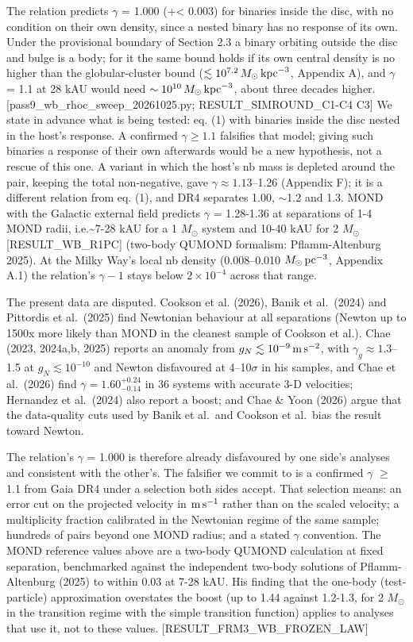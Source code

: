 \documentclass[
  10pt,
]{article}
\begin{document}
The relation predicts $\gamma$ = 1.000 (+\textless{} 0.003) for binaries inside the disc, with no condition on their own density, since a nested binary has no response of its own. Under the provisional boundary of Section 2.3 a binary orbiting outside the disc and bulge is a body; for it the same bound holds if its own central density is no higher than the globular-cluster bound ($\lesssim10^{7.2}\,M_\odot\,{\rm kpc}^{-3}$, Appendix A), and $\gamma$ = 1.1 at 28 kAU would need $\sim10^{10}\,M_\odot\,{\rm kpc}^{-3}$, about three decades higher. {[}pass9\_wb\_rhoc\_sweep\_20261025.py; RESULT\_SIMROUND\_C1-C4 C3{]} We state in advance what is being tested: eq. (1) with binaries inside the disc nested in the host's response. A confirmed $\gamma\ge1.1$ falsifies that model; giving such binaries a response of their own afterwards would be a new hypothesis, not a rescue of this one. A variant in which the host's nb mass is depleted around the pair, keeping the total non-negative, gave $\gamma\approx1.13$--1.26 (Appendix F); it is a different relation from eq. (1), and DR4 separates 1.00, $\sim$1.2 and 1.3. MOND with the Galactic external field predicts $\gamma$ = 1.28-1.36 at separations of 1-4 MOND radii, i.e.\textasciitilde{}7-28 kAU for a 1 $M_\odot$ system and 10-40 kAU for 2 $M_\odot$ {[}RESULT\_WB\_R1PC{]} (two-body QUMOND formalism: Pflamm-Altenburg 2025). At the Milky Way's local nb density (0.008--0.010 $M_\odot\,{\rm pc}^{-3}$, Appendix A.1) the relation's $\gamma-1$ stays below $2\times10^{-4}$ across that range.

The present data are disputed. Cookson et al. (2026), Banik et al.~(2024) and Pittordis et al.~(2025) find Newtonian behaviour at all separations (Newton up to 1500x more likely than MOND in the cleanest sample of Cookson et al.). Chae (2023, 2024a,b, 2025) reports an anomaly from $g_N\lesssim10^{-9}\,{\rm m\,s^{-2}}$, with $\gamma_g\approx1.3$--1.5 at $g_N\lesssim10^{-10}$ and Newton disfavoured at 4--10$\sigma$ in his samples, and Chae et al.~(2026) find $\gamma=1.60^{+0.24}_{-0.14}$ in 36 systems with accurate 3-D velocities; Hernandez et al.~(2024) also report a boost; and Chae \& Yoon (2026) argue that the data-quality cuts used by Banik et al.~and Cookson et al.~bias the result toward Newton.

The relation's $\gamma$ = 1.000 is therefore already disfavoured by one side's analyses and consistent with the other's. The falsifier we commit to is a confirmed $\gamma$ $\ge$ 1.1 from Gaia DR4 under a selection both sides accept. That selection means: an error cut on the projected velocity in ${\rm m\,s^{-1}}$ rather than on the scaled velocity; a multiplicity fraction calibrated in the Newtonian regime of the same sample; hundreds of pairs beyond one MOND radius; and a stated $\gamma$ convention. The MOND reference values above are a two-body QUMOND calculation at fixed separation, benchmarked against the independent two-body solutions of Pflamm-Altenburg (2025) to within 0.03 at 7-28 kAU. His finding that the one-body (test-particle) approximation overstates the boost (up to 1.44 against 1.2-1.3, for 2 $M_\odot$ in the transition regime with the simple transition function) applies to analyses that use it, not to these values. {[}RESULT\_FRM3\_WB\_FROZEN\_LAW{]}
\end{document}
